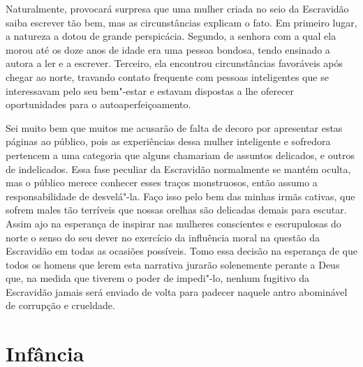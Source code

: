 Naturalmente, provocará surpresa que
uma mulher criada no seio da Escravidão saiba escrever tão bem, mas as
circunstâncias explicam o fato. Em primeiro lugar, a natureza a dotou de
grande perspicácia. Segundo, a senhora com a qual ela morou até os doze
anos de idade era uma pessoa bondosa, tendo ensinado a autora a ler e a
escrever. Terceiro, ela encontrou circunstâncias favoráveis após chegar
ao norte, travando contato frequente com pessoas inteligentes que se
interessavam pelo seu bem"-estar e estavam dispostas a lhe oferecer
oportunidades para o autoaperfeiçoamento.

Sei muito bem que muitos me acusarão de
falta de decoro por apresentar estas páginas ao público, pois as
experiências dessa mulher inteligente e sofredora pertencem a uma
categoria que alguns chamariam de assuntos delicados, e outros de
indelicados. Essa fase peculiar da Escravidão normalmente se mantém
oculta, mas o público merece conhecer esses traços monstruosos, então
assumo a responsabilidade de desvelá"-la. Faço isso pelo bem das minhas
irmãs cativas, que sofrem males tão terríveis que nossas orelhas são
delicadas demais para escutar. Assim ajo na esperança de inspirar nas
mulheres conscientes e escrupulosas do norte o senso do seu dever no
exercício da influência moral na questão da Escravidão em todas as
ocasiões possíveis. Tomo essa decisão na esperança de que todos os
homens que lerem esta narrativa jurarão solenemente perante a Deus que,
na medida que tiverem o poder de impedi"-lo,
nenhum fugitivo da Escravidão
jamais será enviado de volta para padecer naquele antro abominável de
corrupção e crueldade.


\chapter*{Infância}

